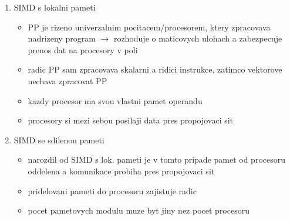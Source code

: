 \documentclass[10pt]{article}
\begin{document}
\begin{enumerate}
\item SIMD s lokalni pameti\begin{itemize}
	\item PP je rizeno univerzalnim pocitacem/procesorem, ktery zpracovava nadrizeny program $\rightarrow$ rozhoduje o maticovych ulohach a zabezpecuje prenos dat na procesory v poli
	\item radic PP sam zpracovava skalarni a ridici instrukce, zatimco vektorove nechava zpracovat PP
	\item kazdy procesor ma svou vlastni pamet operandu
	\item procesory si mezi sebou posilaji data pres propojovaci sit
	\end{itemize}
	
\item SIMD se sdilenou pameti \begin{itemize}
	\item narozdil od SIMD s lok. pameti je v tomto pripade pamet od procesoru oddelena a komunikace probiha pres propojovaci sit
	\item pridelovani pameti do procesoru zajistuje radic
	\item pocet pametovych modulu muze byt jiny nez pocet procesoru
	\end{itemize}
\end{enumerate}
\end{document}
